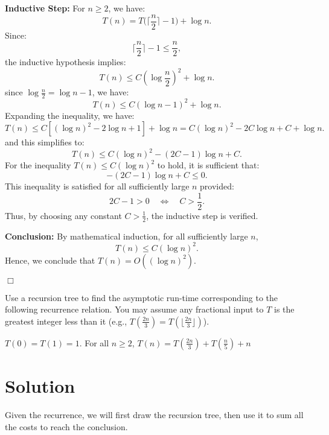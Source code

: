 \documentclass[11pt]{article}
\begin{document}
        \textbf{Inductive Step:}  
        For \( n \ge 2 \), we have:
        \[
        T(n) = T\Big(\Big\lceil\frac{n}{2}\Big\rceil-1\Big) + \log n.
        \]
        Since:
        \[
        \Big\lceil\frac{n}{2}\Big\rceil - 1 \le \frac{n}{2},
        \]
        the inductive hypothesis implies:
        \[
        T(n) \le C \left(\log \frac{n}{2}\right)^2 + \log n.
        \]
        since \( \log \frac{n}{2} = \log n - 1 \), we have:
        \[
        T(n) \le C (\log n - 1)^2 + \log n.
        \]
        Expanding the inequality, we have:
        \[
        T(n) \le C\left[(\log n)^2 - 2\log n + 1\right] + \log n = C (\log n)^2 - 2C \log n + C + \log n.
        \]
        and this simplifies to:
        \[
        T(n) \le C (\log n)^2 - (2C - 1)\log n + C.
        \]
        For the inequality \( T(n) \le C (\log n)^2 \) to hold, it is sufficient that:
        \[
        -(2C - 1)\log n + C \le 0.
        \]
        This inequality is satisfied for all sufficiently large \( n \) provided:
        \[
        2C - 1 > 0 \quad \Longleftrightarrow \quad C > \frac{1}{2}.
        \]
        Thus, by choosing any constant \( C > \frac{1}{2} \), the inductive step is verified.

        \textbf{Conclusion:}  
        By mathematical induction, for all sufficiently large \( n \),
        \[
        T(n) \le C (\log n)^2.
        \]
        Hence, we conclude that \( T(n)=O((\log n)^2) \).

        \hfill\(\Box\)
    \newpage
    
    \begin{tcolorbox}[title={Problem 1B (9 pts)}]
        Use a recursion tree to find the asymptotic run-time corresponding to the following recurrence relation. You may assume any fractional input to $T$ is the greatest integer less than it (e.g., $T(\frac{2n}{3}) = T(\lfloor\frac{2n}{3}\rfloor)$).
        \begin{center}
            $T(0) = T(1) = 1$. For all $n\geq 2$, $T(n) = T(\frac{2n}{3}) + T(\frac{n}{5}) + n$
        \end{center}
    \end{tcolorbox}
    \section*{Solution}

    Given the recurrence, we will first draw the recursion tree, then use it to sum all the costs to reach the conclusion.
\end{document}
